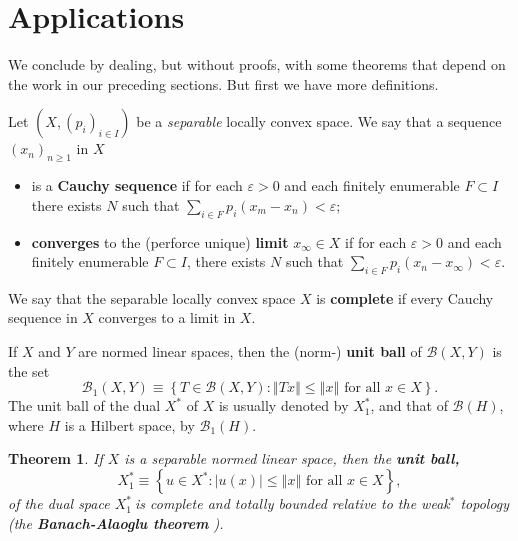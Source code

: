\documentclass{article}%
\newtheorem{theorem}{Theorem}
\begin{document}
%

\medskip


\section{Applications}

We conclude by dealing, but without proofs, with some theorems that depend on
the work in our preceding sections. But first we have more definitions.

Let $\left(  X,\left(  p_{i}\right)  _{i\in I}\right)  $ be a \emph{separable}
locally convex space. We say that a sequence $\left(  x_{n}\right)  _{n\geq1}$
in $X$

\begin{itemize}
\item is a \textbf{Cauchy sequence} if for each $\varepsilon>0$ and each
finitely enumerable $F\subset I$ there exists $N$ such that $\sum_{i\in
F}p_{i}(x_{m}-x_{n})<\varepsilon$;

\item \textbf{converges} to the (perforce unique) \textbf{limit} $x_{\infty
}\in X$ if for each $\varepsilon>0$ and each finitely enumerable $F\subset I
$, there exists $N$ such that $\sum_{i\in F}p_{i}(x_{n}-x_{\infty
})<\varepsilon$.
\end{itemize}

%

\noindent
We say that the separable locally convex space $X$ is \textbf{complete} if
every Cauchy sequence in $X$ converges to a limit in $X$.%

\medskip
If $X$ and $Y$ are normed linear spaces, then the (norm-) \textbf{unit ball
}of $\mathcal{B}(X,Y)$ is the set%
\[
\mathcal{B}_{1}(X,Y)\equiv\left\{  T\in\mathcal{B}(X,Y):\left\Vert
Tx\right\Vert \leq\left\Vert x\right\Vert \text{ for all }x\in X\right\}  .
\]
The unit ball of the dual $X^{\ast}$ of $X$ is usually denoted by $X_{1}%
^{\ast}$, and that of $\mathcal{B}(H)$, where $H$ is a Hilbert space, by
$\mathcal{B}_{1}(H)$.

\begin{theorem}
\label{jan30t1}If $X$ is a separable normed linear space, then the
\textbf{unit ball,}%
\[
X_{1}^{\ast}\equiv\left\{  u\in X^{\ast}:\left\vert u(x)\right\vert
\leq\left\Vert x\right\Vert \text{ for all }x\in X\right\}  ,
\]
of the dual space $X_{1}^{\ast}\ $is complete and totally bounded relative to
the weak$^{\ast}$ topology (the \textbf{Banach-Alaoglu theorem}
\emph{\cite[5.4.7]{BVtech}).}
\end{theorem}
\end{document}
